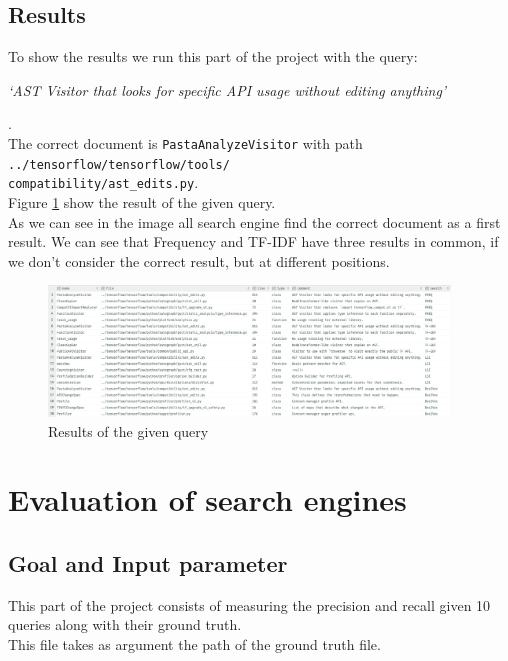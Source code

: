 \documentclass [14 pt]{article}
\begin{document}
\subsection{Results} %
To show the results we run this part of the project with the query:\\
\centerline{\emph{`AST Visitor that looks for specific API usage without editing anything'}}.\\
The correct document is \texttt{PastaAnalyzeVisitor} with path \texttt{../tensorflow/tensorflow/tools/\\compatibility/ast\_edits.py}.\\
Figure \ref{fig:Part2} show the result of the given query.\\
As we can see in the image all search engine find the correct document as a first result. 
We can see that Frequency and TF-IDF have three results in common, if we don't consider the correct result, but at different positions. 
\begin{figure}[h]
\centering
\includegraphics[width=0.95\textwidth]{../res/part2.png}
\caption{Results of the given query}\label{fig:Part2}
\end{figure}


\section{Evaluation of search engines} %
\subsection{Goal and Input parameter} %
This part of the project consists of measuring the precision and recall given 10 queries along with their ground truth.\\
This file takes as argument the path of the ground truth file.
\end{document}

